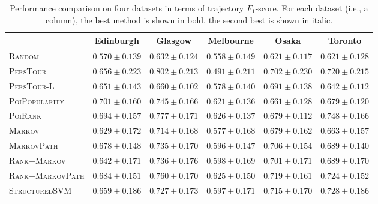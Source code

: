 \begin{table}
\caption{Performance comparison on four datasets in terms of trajectory $F_1$-score.
         For each dataset (i.e., a column), the best method is shown in bold, the second best is shown in italic.}
\label{tab:f1}
\centering
\begin{tabular}{l|ccccc} \hline
 & Edinburgh & Glasgow & Melbourne & Osaka & Toronto \\ \hline
\textsc{Random} & $0.570\pm0.139$ & $0.632\pm0.124$ & $0.558\pm0.149$ & $0.621\pm0.117$ & $0.621\pm0.128$ \\
\textsc{PersTour}\cite{ijcai15} & $0.656\pm0.223$ & $\mathbf{0.802\pm0.213}$ & $0.491\pm0.211$ & $0.702\pm0.230$ & $0.720\pm0.215$ \\
\textsc{PersTour-L} & $0.651\pm0.143$ & $0.660\pm0.102$ & $0.578\pm0.140$ & $0.691\pm0.138$ & $0.642\pm0.112$ \\
\textsc{PoiPopularity} & $\mathbf{0.701\pm0.160}$ & $0.745\pm0.166$ & $0.621\pm0.136$ & $0.661\pm0.128$ & $0.679\pm0.120$ \\
\textsc{PoiRank} & $\mathit{0.694\pm0.157}$ & $\mathit{0.777\pm0.171}$ & $\mathbf{0.626\pm0.137}$ & $0.679\pm0.112$ & $\mathbf{0.748\pm0.166}$ \\
\textsc{Markov} & $0.629\pm0.172$ & $0.714\pm0.168$ & $0.577\pm0.168$ & $0.679\pm0.162$ & $0.663\pm0.157$ \\
\textsc{MarkovPath} & $0.678\pm0.148$ & $0.735\pm0.170$ & $0.596\pm0.147$ & $0.706\pm0.154$ & $0.689\pm0.140$ \\
\textsc{Rank+Markov} & $0.642\pm0.171$ & $0.736\pm0.176$ & $0.598\pm0.169$ & $0.701\pm0.171$ & $0.689\pm0.170$ \\
\textsc{Rank+MarkovPath} & $0.684\pm0.151$ & $0.760\pm0.170$ & $\mathit{0.625\pm0.150}$ & $\mathbf{0.719\pm0.161}$ & $0.724\pm0.152$ \\
\textsc{StructuredSVM} & $0.659\pm0.186$ & $0.727\pm0.173$ & $0.597\pm0.171$ & $\mathit{0.715\pm0.170}$ & $\mathit{0.728\pm0.186}$ \\
\hline
\end{tabular}
\end{table}


